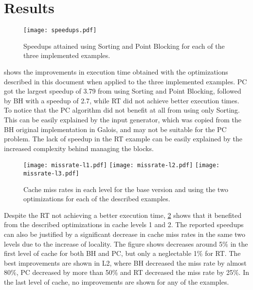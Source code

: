 \section{Results}
\label{sec:results}

\begin{figure}
	\texttt{[image: speedups.pdf]}
	\caption{Speedups attained using Sorting and Point Blocking for each of the three implemented examples.}
	\label{fig:speedups}
\end{figure}


 shows the improvements in execution time obtained with the optimizations described in this document when applied to the three implemented examples. PC got the largest speedup of 3.79 from using Sorting and Point Blocking, followed by BH with a speedup of 2.7, while RT did not achieve better execution times. To notice that the PC algorithm did not benefit at all from using only Sorting. This can be easily explained by the input generator, which was copied from the BH original implementation in Galois, and may not be suitable for the PC problem. The lack of speedup in the RT example can be easily explained by the increased complexity behind managing the blocks.




\begin{figure}
	\texttt{[image: missrate-l1.pdf]}
	\texttt{[image: missrate-l2.pdf]}
	\texttt{[image: missrate-l3.pdf]}
	\caption{Cache miss rates in each level for the base version and using the two optimizations for each of the described examples.}
	\label{fig:misses}
\end{figure}

Despite the RT not achieving a better execution time, \cref{fig:misses} shows that it benefited from the described optimizations in cache levels 1 and 2. The reported speedups can also be justified by a significant decrease in cache miss rates in the same two levels due to the increase of locality. The figure shows decreases around 5\% in the first level of cache for both BH and PC, but only a neglectable 1\% for RT. The best improvements are shown in L2, where BH decreased the miss rate by almost 80\%, PC decreased by more than 50\% and RT decreased the miss rate by 25\%. In the last level of cache, no improvements are shown for any of the examples.
